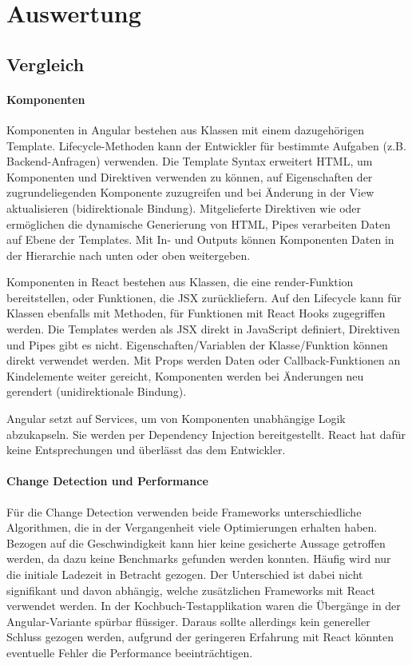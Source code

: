 \chapter{Auswertung}
\section{Vergleich}
\subsubsection{Komponenten}
Komponenten in Angular bestehen aus Klassen mit einem dazugehörigen Template. Lifecycle-Methoden kann der Entwickler für bestimmte Aufgaben (z.B. Backend-Anfragen) verwenden.
Die Template Syntax erweitert HTML, um Komponenten und Direktiven verwenden zu können, auf Eigenschaften der zugrundeliegenden Komponente zuzugreifen und bei Änderung in der View aktualisieren (bidirektionale Bindung). Mitgelieferte Direktiven wie  oder  ermöglichen die dynamische Generierung von HTML, Pipes verarbeiten Daten auf Ebene der Templates. Mit In- und Outputs können Komponenten Daten in der Hierarchie nach unten oder oben weitergeben.

Komponenten in React bestehen aus Klassen, die eine render-Funktion bereitstellen, oder Funktionen, die JSX zurückliefern. Auf den Lifecycle kann für Klassen ebenfalls mit Methoden, für Funktionen mit React Hooks zugegriffen werden. Die Templates werden als JSX direkt in JavaScript definiert, Direktiven und Pipes gibt es nicht. Eigenschaften/Variablen der Klasse/Funktion können direkt verwendet werden. Mit Props werden Daten oder Callback-Funktionen an Kindelemente weiter gereicht, Komponenten werden bei Änderungen neu gerendert (unidirektionale Bindung).

Angular setzt auf Services, um von Komponenten unabhängige Logik abzukapseln. Sie werden per Dependency Injection bereitgestellt. React hat dafür keine Entsprechungen und überlässt das dem Entwickler.

\subsubsection{Change Detection und Performance}
Für die Change Detection verwenden beide Frameworks unterschiedliche Algorithmen, die in der Vergangenheit viele Optimierungen erhalten haben. Bezogen auf die Geschwindigkeit kann hier keine gesicherte Aussage getroffen werden, da dazu keine Benchmarks gefunden werden konnten. Häufig wird nur die initiale Ladezeit in Betracht gezogen. Der Unterschied ist dabei nicht signifikant und davon abhängig, welche zusätzlichen Frameworks mit React verwendet werden\cite{Benchmark}. In der Kochbuch-Testapplikation waren die Übergänge in der Angular-Variante spürbar flüssiger. Daraus sollte allerdings kein genereller Schluss gezogen werden, aufgrund der geringeren Erfahrung mit React könnten eventuelle Fehler die Performance beeinträchtigen.

